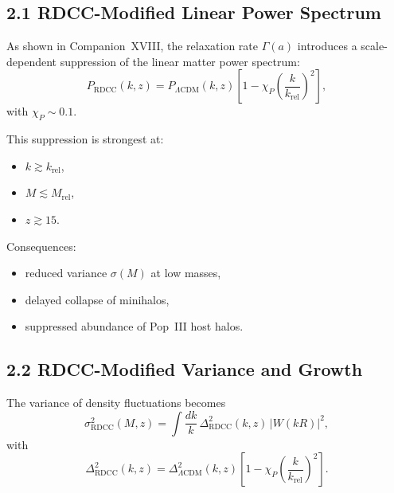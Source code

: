\documentclass[11pt,a4paper]{article}
\begin{document}
\subsection*{2.1 RDCC-Modified Linear Power Spectrum}

As shown in Companion~XVIII, the relaxation rate $\Gamma(a)$ introduces a scale-dependent 
suppression of the linear matter power spectrum:
\begin{equation}
    P_{\mathrm{RDCC}}(k,z)
    = P_{\Lambda\mathrm{CDM}}(k,z)
      \left[
        1 - \chi_{P}
        \left(\frac{k}{k_{\mathrm{rel}}}\right)^2
      \right],
\end{equation}
with $\chi_{P} \sim 0.1$.

This suppression is strongest at:
\begin{itemize}
    \item $k \gtrsim k_{\mathrm{rel}}$,
    \item $M \lesssim M_{\mathrm{rel}}$,
    \item $z \gtrsim 15$.
\end{itemize}

Consequences:

\begin{itemize}
    \item reduced variance $\sigma(M)$ at low masses,
    \item delayed collapse of minihalos,
    \item suppressed abundance of Pop~III host halos.
\end{itemize}

\subsection*{2.2 RDCC-Modified Variance and Growth}

The variance of density fluctuations becomes
\begin{equation}
    \sigma_{\mathrm{RDCC}}^2(M,z)
    = \int \frac{dk}{k}\,
      \Delta^2_{\mathrm{RDCC}}(k,z)\,
      |W(kR)|^2,
\end{equation}
with
\begin{equation}
    \Delta^2_{\mathrm{RDCC}}(k,z)
    = \Delta^2_{\Lambda\mathrm{CDM}}(k,z)
      \left[
        1 - \chi_{P}
        \left(\frac{k}{k_{\mathrm{rel}}}\right)^2
      \right].
\end{equation}
\end{document}
